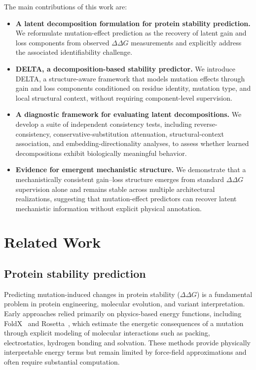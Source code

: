 \documentclass[11pt,a4paper]{article}
\theoremstyle{plain}
\theoremstyle{definition}
\begin{document}
The main contributions of this work are:
\begin{itemize}
\item \textbf{A latent decomposition formulation for protein stability prediction.}
We reformulate mutation-effect prediction as the recovery of latent gain and loss components from observed $\Delta\Delta G$ measurements and explicitly address the associated identifiability challenge.
\item \textbf{DELTA, a decomposition-based stability predictor.}
We introduce DELTA, a structure-aware framework that models mutation effects through gain and loss components conditioned on residue identity, mutation type, and local structural context, without requiring component-level supervision.
\item \textbf{A diagnostic framework for evaluating latent decompositions.}
We develop a suite of independent consistency tests, including reverse-consistency, conservative-substitution attenuation, structural-context association, and embedding-directionality analyses, to assess whether learned decompositions exhibit biologically meaningful behavior.
\item \textbf{Evidence for emergent mechanistic structure.}
We demonstrate that a mechanistically consistent gain--loss structure emerges from standard $\Delta\Delta G$ supervision alone and remains stable across multiple architectural realizations, suggesting that mutation-effect predictors can recover latent mechanistic information without explicit physical annotation.
\end{itemize}

\section{Related Work}
\subsection{Protein stability prediction}
Predicting mutation-induced changes in protein stability ($\Delta\Delta G$) is a fundamental problem in protein engineering, molecular evolution, and variant interpretation. Early approaches relied primarily on physics-based energy functions, including FoldX~\cite{schymkowitz2005foldx} and Rosetta~\cite{leaver2011rosetta3}, which estimate the energetic consequences of a mutation through explicit modeling of molecular interactions such as packing, electrostatics, hydrogen bonding and solvation. These methods provide physically interpretable energy terms but remain limited by force-field approximations and often require substantial computation.
\end{document}
